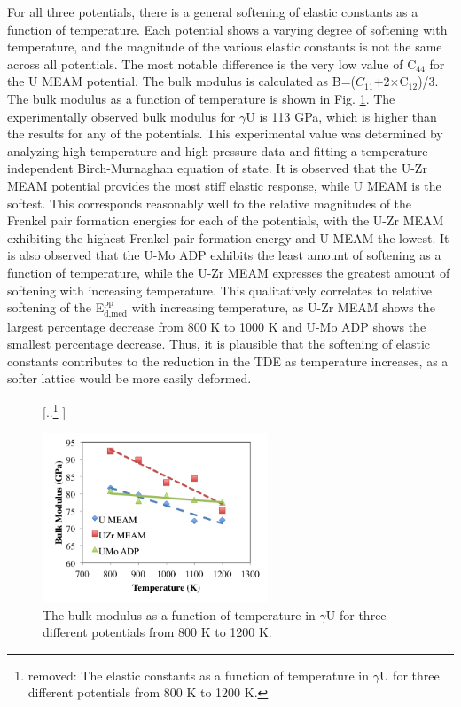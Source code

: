 \documentclass[review]{elsarticle}
\providecommand{\DIFdeltex}[1]{{\protect\color{red} [..\footnote{removed: #1} ]}} %
\providecommand{\DIFaddend}{} %
\providecommand{\DIFdelFL}[1]{\DIFdel{#1}} %
\providecommand{\DIFdelbeginFL}{} %
\providecommand{\DIFdelendFL}{} %
\providecommand{\DIFdel}[1]{\texorpdfstring{\DIFdeltex{#1}}{}} %
\newcommand{\DIFscaledelfig}{0.5}
\newlength{\DIFdelgraphicswidth} %
\newlength{\DIFdelgraphicsheight} %
\newcommand{\DIFdelincludegraphics}[2][]{%
\sbox{\DIFdelgraphicsbox}{\DIFOincludegraphics[#1]{#2}}%
\settoboxwidth{\DIFdelgraphicswidth}{\DIFdelgraphicsbox} %
\settoboxtotalheight{\DIFdelgraphicsheight}{\DIFdelgraphicsbox} %
\scalebox{\DIFscaledelfig}{%
\parbox[b]{\DIFdelgraphicswidth}{\usebox{\DIFdelgraphicsbox}\\[-\baselineskip] \rule{\DIFdelgraphicswidth}{0em}}\llap{\resizebox{\DIFdelgraphicswidth}{\DIFdelgraphicsheight}{%
\setlength{\unitlength}{\DIFdelgraphicswidth}%
\begin{picture}(1,1)%
\thicklines\linethickness{2pt} %
{\color[rgb]{1,0,0}\put(0,0){\framebox(1,1){}}}%
{\color[rgb]{1,0,0}\put(0,0){\line( 1,1){1}}}%
{\color[rgb]{1,0,0}\put(0,1){\line(1,-1){1}}}%
\end{picture}%
}\hspace*{3pt}}} %
} %
\DeclareRobustCommand{\DIFaddend}{\DIFOaddend \let\includegraphics\DIFOincludegraphics} %
\DeclareRobustCommand{\DIFdelbeginFL}{\DIFOdelbeginFL \let\includegraphics\DIFdelincludegraphics} %
\DeclareRobustCommand{\DIFdelendFL}{\DIFOaddendFL \let\includegraphics\DIFOincludegraphics} %
\begin{document}
\FloatBarrier

\DIFaddend For all three potentials, there is a general softening of elastic constants as a function of temperature. Each potential shows a varying degree of softening with temperature, and the magnitude of the various elastic constants is not the same across all potentials. The most notable difference is the very low value of C$_{44}$ for the U MEAM potential. The bulk modulus is calculated as B=($C_{11}$+2$\times$C$_{12}$)/3. The bulk modulus as a function of temperature is shown in Fig. \ref{fig:bulk}. The experimentally observed bulk modulus for $\gamma$U is 113 GPa\cite{yoo1998}, which is higher than the results for any of the potentials. This experimental value was determined by analyzing high temperature and high pressure data and fitting a temperature independent Birch-Murnaghan equation of state. It is observed that the U-Zr MEAM potential provides the most stiff elastic response, while U MEAM is the softest. This corresponds reasonably well to the relative magnitudes of the Frenkel pair formation energies for each of the potentials, with the U-Zr MEAM exhibiting the highest Frenkel pair formation energy and U MEAM the lowest. It is also observed that the U-Mo ADP exhibits the least amount of softening as a function of temperature, while the U-Zr MEAM expresses the greatest amount of softening with increasing temperature. This qualitatively correlates to relative softening of the E$^{\textrm{pp}}_{\textrm{d,med}}$ with increasing temperature, as U-Zr MEAM shows the largest percentage decrease from 800 K to 1000 K and U-Mo ADP shows the smallest percentage decrease. Thus, it is plausible that the softening of elastic constants contributes to the reduction in the TDE as temperature increases, as a softer lattice would be more easily deformed. 

\begin{figure}[h]
 \centering
 \DIFdelbeginFL %
{%
\DIFdelFL{The elastic constants as a function of temperature in $\gamma$U for three different potentials from 800 K to 1200 K.}}

\DIFdelendFL \includegraphics[width=0.6\textwidth]{bulk_vs_Tb.png} 
 \caption{The bulk modulus as a function of temperature in $\gamma$U for three different potentials from 800 K to 1200 K.}
 \label{fig:bulk}
\end{figure}
\end{document}
